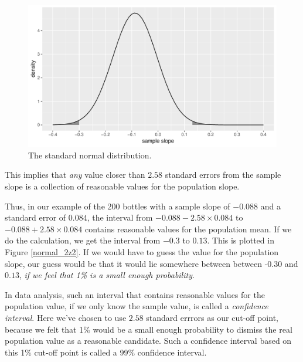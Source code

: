 \documentclass[]{report}\usepackage[]{graphicx}\usepackage[]{color}
\makeatletter
\def\maxwidth{ %
  \ifdim\Gin@nat@width>\linewidth
    \linewidth
  \else
    \Gin@nat@width
  \fi
}
\newenvironment{knitrout}{}{} %
\makeatother
\begin{document}
\begin{knitrout}
\color{fgcolor}\begin{figure}

{\centering \includegraphics[width=\maxwidth]{figure/normal_2z2-1} 

}

\caption[The standard normal distribution]{The standard normal distribution.}\label{fig:normal_2z2}
\end{figure}


\end{knitrout}

This implies that \textit{any} value closer than $2.58$ standard errors from the sample slope is a collection of reasonable values for the population slope.

Thus, in our example of the 200 bottles with a sample slope of $-0.088$ and a standard error of $0.084$, the interval from $-0.088- 2.58 \times 0.084$ to $-0.088+ 2.58 \times 0.084$ contains reasonable values for the population mean. If we do the calculation, we get the interval from $-0.3$ to $0.13$. This is plotted in Figure \ref{normal_2z2}. If we would have to guess the value for the population slope, our guess would be that it would lie somewhere between between -0.30 and $0.13$, \textit{if we feel that 1\% is a small enough probability}.

In data analysis, such an interval that contains reasonable values for the population value, if we only know the sample value, is called a \textit{confidence interval}. Here we've chosen to use $2.58$ standard errrors as our cut-off point, because we felt that 1\% would be a small enough probability to dismiss the real population value as a reasonable candidate. Such a confidence interval based on this 1\% cut-off point is called a 99\% confidence interval.
\end{document}
